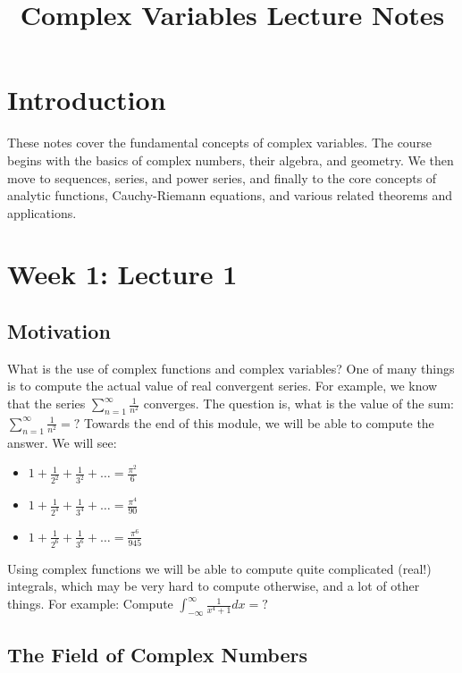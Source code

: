 \documentclass[12pt]{article}
\title{Complex Variables Lecture Notes}
\author{}
\date{}
\begin{document}
\maketitle
\tableofcontents
\newpage

\section{Introduction}

These notes cover the fundamental concepts of complex variables. The course begins with the basics of complex numbers, their algebra, and geometry.  We then move to sequences, series, and power series, and finally to the core concepts of analytic functions, Cauchy-Riemann equations, and various related theorems and applications.

\section{Week 1: Lecture 1}

\subsection{Motivation}

What is the use of complex functions and complex variables? One of many things is to compute the actual value of real convergent series.  For example, we know that the series $\sum_{n=1}^\infty \frac{1}{n^2}$ converges.  The question is, what is the value of the sum:  $\sum_{n=1}^\infty \frac{1}{n^2} = ?$  Towards the end of this module, we will be able to compute the answer. We will see:

\begin{itemize}
    \item $1 + \frac{1}{2^2} + \frac{1}{3^2} + \dots = \frac{\pi^2}{6}$
    \item $1 + \frac{1}{2^4} + \frac{1}{3^4} + \dots = \frac{\pi^4}{90}$
    \item $1 + \frac{1}{2^6} + \frac{1}{3^6} + \dots = \frac{\pi^6}{945}$
\end{itemize}

Using complex functions we will be able to compute quite complicated (real!) integrals, which may be very hard to compute otherwise, and a lot of other things. For example: Compute $\int_{-\infty}^{\infty} \frac{1}{x^4+1} dx = ?$

\subsection{The Field of Complex Numbers}
\end{document}
